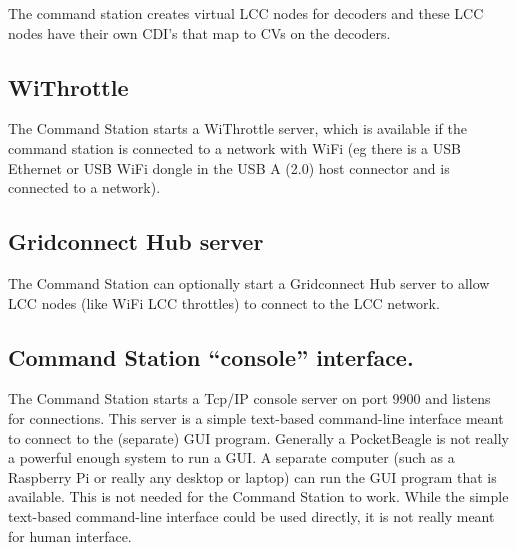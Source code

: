 The command station creates virtual LCC nodes for decoders and these LCC nodes 
have their own CDI's that map to CVs on the decoders.

\subsection{WiThrottle}

The Command Station starts a WiThrottle server, which is available if the 
command station is connected to a network with WiFi (eg there is a USB 
Ethernet or USB WiFi dongle in the USB A (2.0) host connector and is connected 
to a network).

\subsection{Gridconnect Hub server}

The Command Station can optionally start a Gridconnect Hub server to allow LCC 
nodes (like WiFi LCC throttles) to connect to the LCC network.

\subsection{Command Station ``console'' interface.}

The Command Station starts a Tcp/IP console server on port 9900 and listens
for connections. This server is a simple text-based command-line interface
meant to connect to the (separate) GUI program. Generally a PocketBeagle is
not really a powerful enough system to run a GUI. A separate computer (such as
a Raspberry Pi or really any desktop or laptop) can run the GUI program that
is available. This is not needed for the Command Station to work. While the
simple text-based command-line interface could be used directly, it is not
really meant for human interface.

